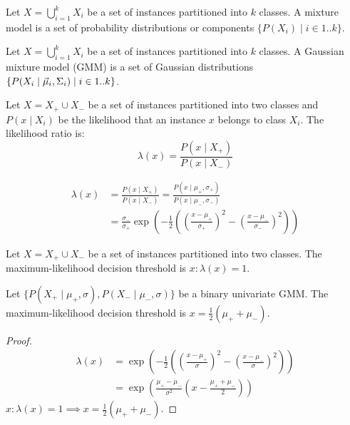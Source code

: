 \begin{dfn}
  Let $X = \bigcup_{i = 1}^k X_i$ be a set of instances partitioned into $k$ classes.
  A mixture model is a set of probability distributions or components
  $\{ P(X_i) \mid i \in 1 .. k \}$.
\end{dfn}

\begin{dfn}
  Let $X = \bigcup_{i = 1}^k X_i$ be a set of instances partitioned into $k$ classes.
  A Gaussian mixture model (GMM) is a set of Gaussian distributions
  $\{ P(X_i \mid \vec{\mu}_i, \Sigma_i) \mid i \in 1 .. k \}$.
\end{dfn}

\begin{dfn}
  Let $X = X_+ \cup X_-$ be a set of instances partitioned into two classes and
  $P(x \mid X_i)$ be the likelihood that an instance $x$ belongs to class $X_i$.
  The likelihood ratio is:
  \begin{equation*}
    \lambda(x) = \frac{P(x \mid X_+)}{P(x \mid X_-)}
  \end{equation*}
\end{dfn}

\begin{proposition}
  \begin{align*}
    \lambda(x)
     & = \frac{P(x \mid X_+)}{P(x \mid X_-)}
    = \frac{P(x \mid \mu_+, \sigma_+)}{P(x \mid \mu_-, \sigma_-)} \\
     & = \frac{\sigma_-}{\sigma_+}\exp\left(-\frac{1}{2}\left(
      \left(\frac{x - \mu_+}{\sigma_+} \right)^2 -
      \left(\frac{x - \mu_-}{\sigma_-} \right)^2
      \right)\right)
  \end{align*}
\end{proposition}

\begin{dfn}
  Let $X = X_+ \cup X_-$ be a set of instances partitioned into two classes.
  The maximum-likelihood decision threshold is $x : \lambda(x) = 1$.
\end{dfn}

\begin{proposition}
  Let $\{ P(X_+ \mid \mu_+, \sigma), P(X_- \mid \mu_-, \sigma) \}$ be a binary
  univariate GMM.
  The maximum-likelihood decision threshold is $x = \frac{1}{2}(\mu_+ + \mu_-)$.
  \begin{proof}
    \begin{align*}
      \lambda(x)
       & = \exp\left(-\frac{1}{2}\left(
        \left(\frac{x - \mu_+}{\sigma} \right)^2 -
        \left(\frac{x - \mu_-}{\sigma} \right)^2
      \right)\right)                                      \\[2ex]
       & = \exp\left(\frac{\mu_+ - \mu_-}{\sigma^2}\left(
        x - \frac{\mu_+ + \mu_-}{2}
        \right)\right)
    \end{align*}
    $x : \lambda(x) = 1 \implies x = \frac{1}{2}(\mu_+ + \mu_-)$.
  \end{proof}
\end{proposition}

